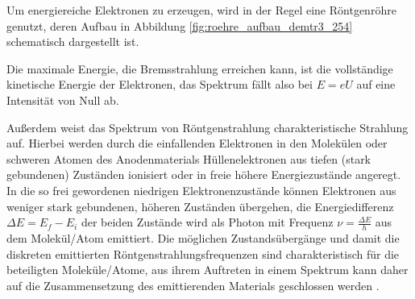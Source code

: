 Um energiereiche Elektronen zu erzeugen, wird in der Regel eine Röntgenröhre genutzt, deren Aufbau in Abbildung \ref{fig:roehre_aufbau_demtr3_254} schematisch dargestellt ist.


Die maximale Energie, die Bremsstrahlung erreichen kann, ist die vollständige kinetische Energie der Elektronen, das Spektrum fällt also bei $E=eU$ auf eine Intensität von Null ab.

Außerdem weist das Spektrum von Röntgenstrahlung charakteristische Strahlung auf. Hierbei werden durch die einfallenden Elektronen in den Molekülen oder schweren Atomen des Anodenmaterials Hüllenelektronen aus tiefen (stark gebundenen) Zuständen ionisiert oder in freie höhere Energiezustände angeregt. In die so frei gewordenen niedrigen Elektronenzustände können Elektronen aus weniger stark gebundenen, höheren Zuständen übergehen, die Energiedifferenz $\Delta E = E_f - E_i $ der beiden Zustände wird als Photon mit Frequenz $\nu = \frac{\Delta E}{h}$ aus dem Molekül/Atom emittiert.
Die möglichen Zustandsübergänge und damit die diskreten emittierten Röntgenstrahlungsfrequenzen sind charakteristisch für die beteiligten Moleküle/Atome, aus ihrem Auftreten in einem Spektrum kann daher auf die Zusammensetzung des emittierenden Materials geschlossen werden \cite[253-256]{Demtroeder3}.
